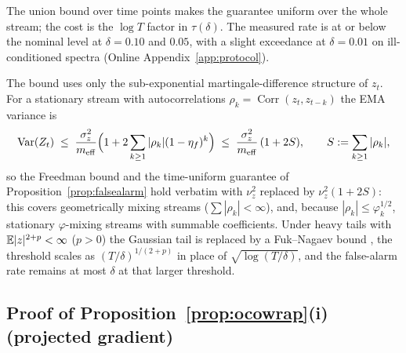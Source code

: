 \begin{remark}
The union bound over time points makes the guarantee uniform over the whole stream; the cost is the $\log T$ factor in $\tau(\delta)$.
The measured rate is at or below the nominal level at $\delta = 0.10$ and $0.05$, with a slight exceedance at $\delta = 0.01$ on ill-conditioned spectra (Online Appendix~\ref{app:protocol}).
\end{remark}

\begin{remark}
\label{rem:mixing}
The bound uses only the sub-exponential martingale-difference structure of $z_t$. For a stationary stream with autocorrelations $\rho_k = \operatorname{Corr}(z_t,z_{t-k})$ the EMA variance is
\[
\operatorname{Var}(Z_t) \;\le\; \frac{\sigma_z^2}{m_{\mathrm{eff}}}\Bigl(1 + 2\sum_{k\ge1}|\rho_k|(1-\eta_f)^k\Bigr) \;\le\; \frac{\sigma_z^2}{m_{\mathrm{eff}}}\,(1 + 2S),
\qquad S := \sum_{k\ge1}|\rho_k|,
\]
so the Freedman bound and the time-uniform guarantee of Proposition~\ref{prop:falsealarm} hold verbatim with $\nu_z^2$ replaced by $\nu_z^2(1+2S)$: this covers geometrically mixing streams ($\sum|\rho_k|<\infty$), and, because $|\rho_k|\le\varphi_k^{1/2}$, stationary $\varphi$-mixing streams with summable coefficients. Under heavy tails with $\mathbb{E}|z|^{2+p}<\infty$ ($p>0$) the Gaussian tail is replaced by a Fuk--Nagaev bound \citep{fuk1971}, the threshold scales as $(T/\delta)^{1/(2+p)}$ in place of $\sqrt{\log(T/\delta)}$, and the false-alarm rate remains at most $\delta$ at that larger threshold.
\end{remark}

\subsection{Proof of Proposition~\ref{prop:ocowrap}(i) (projected gradient)}
\label{app:proof-composition}



